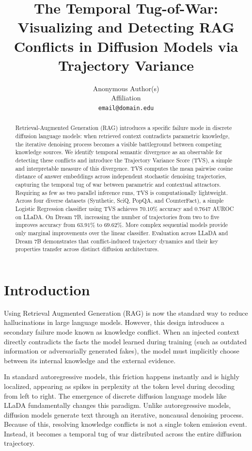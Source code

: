 \documentclass[11pt]{article}
\title{The Temporal Tug-of-War: Visualizing and Detecting RAG Conflicts in Diffusion Models via Trajectory Variance}
\author{
  Anonymous Author(s) \\
  Affiliation \\
  \texttt{email@domain.edu}
}
\begin{document}
\maketitle

\begin{abstract}
Retrieval-Augmented Generation (RAG) introduces a specific failure mode in discrete diffusion language models: when retrieved context contradicts parametric knowledge, the iterative denoising process becomes a visible battleground between competing knowledge sources. We identify temporal semantic divergence as an observable for detecting these conflicts and introduce the Trajectory Variance Score (TVS), a simple and interpretable measure of this divergence. TVS computes the mean pairwise cosine distance of answer embeddings across independent stochastic denoising trajectories, capturing the temporal tug of war between parametric and contextual attractors. Requiring as few as two parallel inference runs, TVS is computationally lightweight. Across four diverse datasets (Synthetic, SciQ, PopQA, and CounterFact), a simple Logistic Regression classifier using TVS achieves $70.10\%$ accuracy and $0.7647$ AUROC on LLaDA. On Dream 7B, increasing the number of trajectories from two to five improves accuracy from $63.91\%$ to $69.62\%$. More complex sequential models provide only marginal improvements over the linear classifier. Evaluation across LLaDA and Dream 7B demonstrates that conflict-induced trajectory dynamics and their key properties transfer across distinct diffusion architectures.
\end{abstract}

\section{Introduction}
Using Retrieval Augmented Generation (RAG) \citep{lewis2020retrieval} is now the standard way to reduce hallucinations in large language models. However, this design introduces a secondary failure mode known as knowledge conflict. When an injected context directly contradicts the facts the model learned during training (such as outdated information or adversarially generated fakes), the model must implicitly choose between its internal knowledge and the external evidence.

In standard autoregressive models, this friction happens instantly and is highly localized, appearing as spikes in perplexity at the token level during decoding from left to right. The emergence of discrete diffusion language models like LLaDA \citep{nie2024llada} fundamentally changes this paradigm. Unlike autoregressive models, diffusion models generate text through an iterative, noncausal denoising process. Because of this, resolving knowledge conflicts is not a single token emission event. Instead, it becomes a temporal tug of war distributed across the entire diffusion trajectory.
\end{document}
